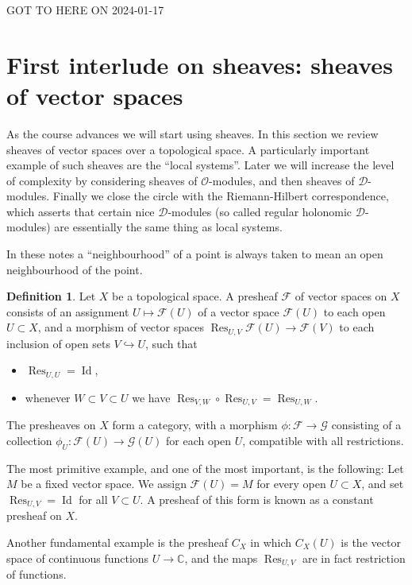 \documentclass[12pt]{article}
\theoremstyle{plain}
\theoremstyle{definition}
\newtheorem{defn}{Definition}[section]
\numberwithin{equation}{section}
\DeclareMathOperator{\res}{Res}
\DeclareMathOperator{\Id}{Id}
\newcommand{\C}{\mathbb{C}}
\newcommand{\CD}{\mathcal{D}}
\newcommand{\CF}{\mathcal{F}}
\newcommand{\CG}{\mathcal{G}}
\newcommand{\OO}{\mathcal{O}}
\begin{document}
{\color{red}GOT TO HERE ON 2024-01-17}

\section{First interlude on sheaves: sheaves of vector spaces}





As the course advances we will start using sheaves. In this section we review sheaves of vector spaces over a topological space. A particularly important example of such sheaves are the ``local systems''. Later we will increase the level of complexity by considering sheaves of $\OO$-modules, and then sheaves of $\CD$-modules. Finally we close the circle with the Riemann-Hilbert correspondence, which asserts that certain nice $\CD$-modules (so called regular holonomic $\CD$-modules) are essentially the same thing as local systems.

In these notes a ``neighbourhood'' of a point is always taken to mean an open neighbourhood of the point.
\begin{defn}
Let $X$ be a topological space. A presheaf $\CF$ of vector spaces on $X$ consists of an assignment $U \mapsto \CF(U)$ of a vector space $\CF(U)$ to each open $U \subset X$, and a morphism of vector spaces $\res_{U, V} \CF(U) \rightarrow \CF(V)$ to each inclusion of open sets $V \hookrightarrow U$, such that
\begin{itemize}
 \item $\res_{U, U} = \Id$,

 \item whenever $W \subset V \subset U$ we have $\res_{V, W} \circ \res_{U, V} = \res_{U, W}$.
\end{itemize}
The presheaves on $X$ form a category, with a morphism $\phi : \CF \rightarrow \CG$ consisting of a collection $\phi_U : \CF(U) \rightarrow \CG(U)$ for each open $U$, compatible with all restrictions.
\end{defn}
The most primitive example, and one of the most important, is the following: Let $M$ be a fixed vector space. We assign $\CF(U) = M$ for every open $U \subset X$, and set $\res_{U, V} = \Id$ for all $V \subset U$. A presheaf of this form is known as a constant presheaf on $X$.

Another fundamental example is the presheaf $C_X$ in which $C_X(U)$ is the vector space of continuous functions $U \rightarrow \C$, and the maps $\res_{U, V}$ are in fact restriction of functions.
\end{document}

